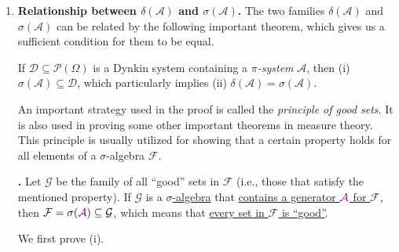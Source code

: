 \begin{enumerate}
\item \textbf{Relationship between \(\delta(\mathcal{A})\) and
\(\sigma(\mathcal{A})\).} The two families \(\delta(\mathcal{A})\) and
\(\sigma(\mathcal{A})\) can be related by the following important theorem,
which gives us a sufficient condition for them to be equal.
\begin{theorem}
\label{thm:dynkin-pi-lambda}
If \(\mathcal{D}\subseteq \mathcal{P}(\Omega)\) is a Dynkin system containing a
\emph{\(\pi\)-system} \(\mathcal{A}\), then (i) \(\sigma(\mathcal{A})\subseteq
\mathcal{D}\), which particularly implies (ii)
\(\delta(\mathcal{A})=\sigma(\mathcal{A})\).
\end{theorem}
An important strategy used in the proof is called the \emph{principle of good
sets}. It is also used in proving some other important theorems in measure
theory. This principle is usually utilized for showing that a certain property
holds for all elements of a \(\sigma\)-algebra \(\mathcal{F}\).

\textbf{.} Let \(\mathcal{G}\) be the family of
all ``good'' sets in \(\mathcal{F}\) (i.e., those that satisfy the mentioned
property). If \(\mathcal{G}\) is a \underline{\(\sigma\)-algebra} that
\underline{contains a generator \({\color{violet}\mathcal{A}}\) for \(\mathcal{F}\)}, then
\(\mathcal{F}=\sigma({\color{violet}\mathcal{A}})\subseteq \mathcal{G}\), which means that
\underline{every set in \(\mathcal{F}\) is ``good''}.


\begin{pf}
We first prove (i).


\end{pf}
\end{enumerate}
